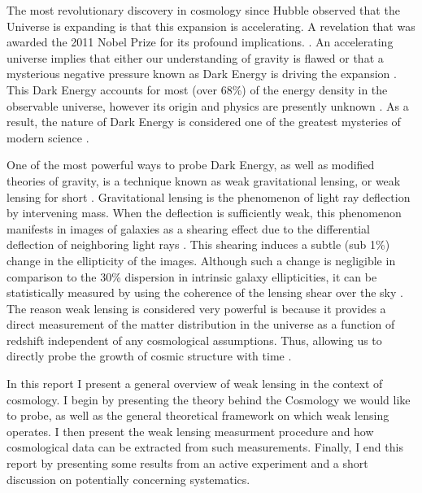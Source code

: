 The most revolutionary discovery in cosmology since 
Hubble observed that the Universe is expanding is that 
this expansion is accelerating. A revelation that was 
awarded the 2011 Nobel Prize for its profound 
implications. \cite{nobel}. An accelerating
universe implies that either our understanding of gravity is flawed 
or that a mysterious negative pressure known as Dark Energy is driving the 
expansion \cite{peebles}.
This Dark Energy accounts for most (over 68\%) of the energy density in the observable universe, 
however its origin and physics are presently unknown \cite{planck}. 
As a result, the nature of Dark Energy is considered one of the 
greatest mysteries of modern science \cite{pathfinder}.  
\par
One of the most powerful ways to probe Dark Energy, as well as modified theories of gravity, is a technique known as weak gravitational lensing, or weak lensing for short \cite{hoekstra,rachel_2018}. Gravitational lensing is the phenomenon of light ray deflection by intervening mass. When the deflection is sufficiently weak, this phenomenon manifests in images of galaxies as a shearing effect due to the differential deflection of neighboring light rays \cite{general_2013,hoekstra}. This shearing induces a subtle (sub 1\%) change in the ellipticity of the images. Although such a change is negligible in comparison to the 30\% dispersion in intrinsic galaxy ellipticities, it can be statistically measured by using the coherence of the lensing shear over the sky \cite{general_2013}. The reason weak lensing is considered very powerful is because it provides a direct measurement of the matter distribution in the universe as a function of redshift independent of any cosmological assumptions. Thus, allowing us to directly probe the growth of cosmic structure with time \cite{hoekstra}. 
\par
In this report I present a general overview of weak lensing in the context of cosmology. I begin by presenting the theory behind the Cosmology we would like to probe, as well as the general theoretical framework on which weak lensing operates. I then present the weak lensing measurment procedure and how cosmological data can be extracted from such measurements. Finally, I end this report by presenting some results from an active experiment and a short discussion on potentially concerning systematics. 